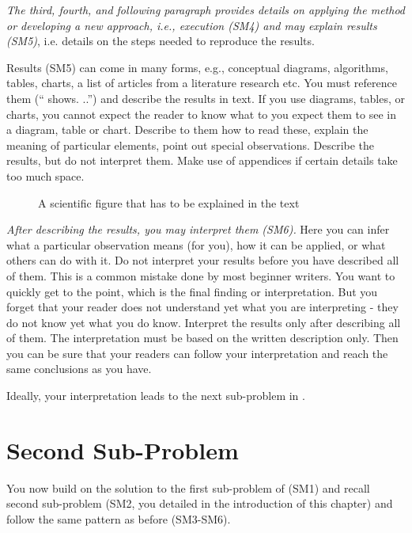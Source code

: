 \emph{The third, fourth, and following paragraph provides details on applying the method or developing a new approach, i.e., execution (SM4) and may explain results (SM5)}, i.e. details on the steps needed to reproduce the results.

Results (SM5) can come in many forms, e.g., conceptual diagrams, algorithms, tables, charts, a list of articles from a literature research etc. You must reference them (`` shows.
..'') and describe the results in text.
If you use diagrams, tables, or charts, you cannot expect the reader to know what to you expect them to see in a diagram, table or chart.
Describe to them how to read these, explain the meaning of particular elements, point out special observations.
Describe the results, but do not interpret them.
Make use of appendices if certain details take too much space.

\begin{figure}
  \centering
  \caption{A scientific figure that has to be explained in the text}
  \label{fig:my_label}
\end{figure}

\emph{After describing the results, you may interpret them (SM6).}
Here you can infer what a particular observation means (for you), how it can be applied, or what others can do with it.
Do not interpret your results before you have described all of them.
This is a common mistake done by most beginner writers.
You want to quickly get to the point, which is the final finding or interpretation.
But you forget that your reader does not understand yet what you are interpreting - they do not know yet what you do know.
Interpret the results only after describing all of them.
The interpretation must be based on the written description only.
Then you can be sure that your readers can follow your interpretation and reach the same conclusions as you have.

Ideally, your interpretation leads to the next sub-problem in .

\section{Second Sub-Problem}\label{sec:problem1:subproblem2}

You now build on the solution to the first sub-problem of  (SM1) and recall second sub-problem (SM2, you detailed in the introduction of this chapter) and follow the same pattern as before (SM3-SM6).

